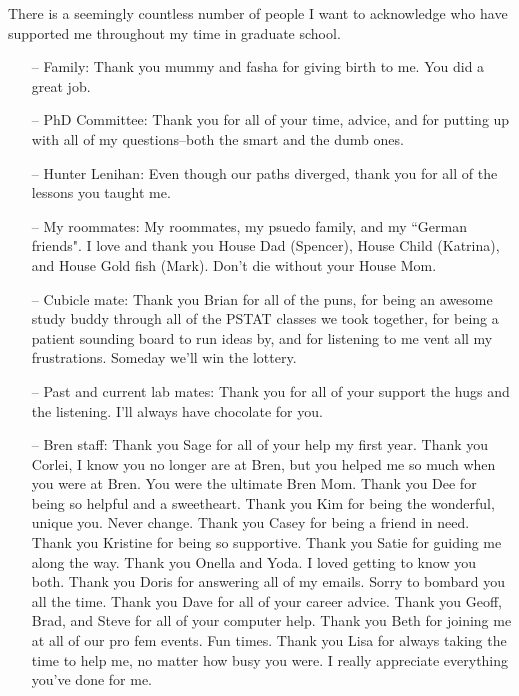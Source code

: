 \begin{acknowledgements}

There is a seemingly countless number of people I want to acknowledge who have supported me throughout my time in graduate school. 

\vspace{-\topsep}
\begin{itemize}
\setlength{\parskip}{0pt}
 \setlength{\itemsep}{0pt plus 1pt}
\item[--] Family: Thank you mummy and fasha for giving birth to me. You did a great job.
\item[--] PhD Committee: Thank you for all of your time, advice, and for putting up with all of my questions--both the smart and the dumb ones.
\item[--] Hunter Lenihan: Even though our paths diverged, thank you for all of the lessons you taught me.
\item[--] My roommates: My roommates, my psuedo family, and my ``German friends". I love and thank you House Dad (Spencer), House Child (Katrina), and House Gold fish (Mark). Don't die without your House Mom.
\item[--] Cubicle mate: Thank you Brian for all of the puns, for being an awesome study buddy through all of the PSTAT classes we took together, for being a patient sounding board to run ideas by, and for listening to me vent all my frustrations. Someday we'll win the lottery.
\item[--] Past and current lab mates: Thank you for all of your support the hugs  and the listening. I'll always have chocolate for you.
\item[--] Bren staff: Thank you Sage for all of your help my first year. Thank you Corlei, I know you no longer are at Bren, but you helped me so much when you were at Bren. You were the ultimate Bren Mom. Thank you Dee for being so helpful and a sweetheart. Thank you Kim for being the wonderful, unique you. Never change. Thank you Casey for being a friend in need. Thank you Kristine for being so supportive. Thank you Satie for guiding me along the way. Thank you Onella and Yoda. I loved getting to know you both. Thank you Doris for answering all of my emails. Sorry to bombard you all the time. Thank you Dave for all of your career advice. Thank you Geoff, Brad, and Steve for all of your computer help. Thank you Beth for joining me at all of our pro fem events. Fun times. Thank you Lisa for always taking the time to help me, no matter how busy you were. I really appreciate everything you've done for me.

\end{itemize}
\end{acknowledgements}
